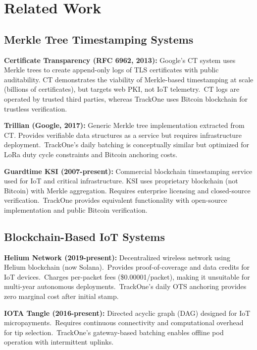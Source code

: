 \section{Related Work}
\label{sec:related-work}

\subsection{Merkle Tree Timestamping Systems}\label{subsec:merkle-tree-timestamping-systems}

\textbf{Certificate Transparency (RFC 6962, 2013):} Google's \ac{CT} system uses Merkle trees to create append-only logs of \ac{TLS} certificates with public auditability. \ac{CT} demonstrates the viability of Merkle-based timestamping at scale (billions of certificates), but targets web \ac{PKI}, not \ac{IoT} telemetry.\ \ac{CT} logs are operated by trusted third parties, whereas TrackOne uses Bitcoin blockchain for trustless verification.

\textbf{Trillian (Google, 2017):} Generic Merkle tree implementation extracted from \ac{CT}.
Provides verifiable data structures as a service but requires infrastructure deployment.\ TrackOne's daily batching is conceptually similar but optimized for \ac{LoRa} duty cycle constraints and Bitcoin anchoring costs.

\textbf{Guardtime KSI (2007-present):} Commercial blockchain timestamping service used for \ac{IoT} and critical infrastructure.
KSI uses proprietary blockchain (not Bitcoin) with Merkle aggregation.
Requires enterprise licensing and closed-source verification.\ TrackOne provides equivalent functionality with open-source implementation and public Bitcoin verification.

\subsection{Blockchain-Based IoT Systems}\label{subsec:blockchain-based-iot-systems}

\textbf{Helium Network (2019-present):} Decentralized wireless network using Helium blockchain (now Solana).\ Provides proof-of-coverage and data credits for \ac{IoT} devices.\ Charges per-packet fees (\$0.00001/packet), making it unsuitable for multi-year autonomous deployments.\ TrackOne's daily \ac{OTS} anchoring provides zero marginal cost after initial stamp.

\textbf{IOTA Tangle (2016-present):} Directed acyclic graph (DAG) designed for \ac{IoT} micropayments.\ Requires continuous connectivity and computational overhead for tip selection.\ TrackOne's gateway-based batching enables offline pod operation with intermittent uplinks.

